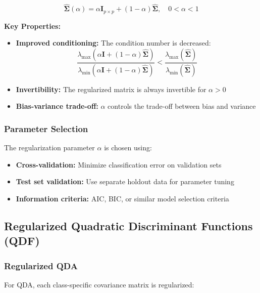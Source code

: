 \documentclass[12pt,a4paper]{article}
\begin{document}
\begin{equation}
\hat{\boldsymbol{\Sigma}}(\alpha) = \alpha \mathbf{I}_{p \times p} + (1-\alpha)\hat{\boldsymbol{\Sigma}}, \quad 0 < \alpha < 1
\end{equation}

\textbf{Key Properties:}
\begin{itemize}
    \item \textbf{Improved conditioning:} The condition number is decreased:
    \begin{equation}
    \frac{\lambda_{\max}(\alpha \mathbf{I} + (1-\alpha)\hat{\boldsymbol{\Sigma}})}{\lambda_{\min}(\alpha \mathbf{I} + (1-\alpha)\hat{\boldsymbol{\Sigma}})} < \frac{\lambda_{\max}(\hat{\boldsymbol{\Sigma}})}{\lambda_{\min}(\hat{\boldsymbol{\Sigma}})}
    \end{equation}
    \item \textbf{Invertibility:} The regularized matrix is always invertible for $\alpha > 0$
    \item \textbf{Bias-variance trade-off:} $\alpha$ controls the trade-off between bias and variance
\end{itemize}

\subsubsection{Parameter Selection}

The regularization parameter $\alpha$ is chosen using:
\begin{itemize}
    \item \textbf{Cross-validation:} Minimize classification error on validation sets
    \item \textbf{Test set validation:} Use separate holdout data for parameter tuning
    \item \textbf{Information criteria:} AIC, BIC, or similar model selection criteria
\end{itemize}

\subsection{Regularized Quadratic Discriminant Functions (QDF)}

\subsubsection{Regularized QDA}

For QDA, each class-specific covariance matrix is regularized:
\end{document}
